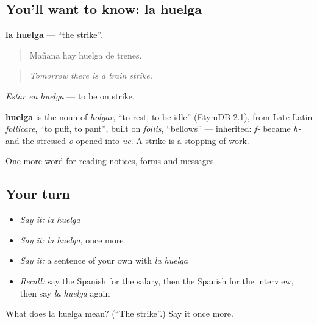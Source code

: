 \subsection*{You'll want to know: la huelga}
\textbf{la huelga} — \textquotedblleft{}the strike\textquotedblright{}.

\begin{quote}
Mañana hay huelga de trenes.
\end{quote}

\begin{quote}
\emph{Tomorrow there is a train strike.}
\end{quote}

\emph{Estar en huelga} — to be on strike.

\begin{cousinweb}
\textbf{huelga} is the noun of \emph{holgar}, \textquotedblleft{}to rest, to be idle\textquotedblright{} (EtymDB 2.1), from Late Latin \emph{follicare}, \textquotedblleft{}to puff, to pant\textquotedblright{}, built on \emph{follis}, \textquotedblleft{}bellows\textquotedblright{} — inherited: \emph{f-} became \emph{h-} and the stressed \emph{o} opened into \emph{ue}. A strike is a stopping of work.
\end{cousinweb}

\begin{grammarlens}[title={What you've built}]
One more word for reading notices, forms and messages.
\end{grammarlens}

\subsection*{Your turn}
\begin{itemize}
\raggedright
  \item \emph{Say it:} \emph{la huelga}
  \item \emph{Say it:} \emph{la huelga}, once more
  \item \emph{Say it:} a sentence of your own with \emph{la huelga}
  \item \emph{Recall:} say the Spanish for the salary, then the Spanish for the interview, then say \emph{la huelga} again
\end{itemize}

\begin{tcolorbox}[breakable,colback=teal!4,colframe=teal!35!black,title={Before you move on}]
What does la huelga mean? (\textquotedblleft{}The strike\textquotedblright{}.) Say it once more.
\end{tcolorbox}
